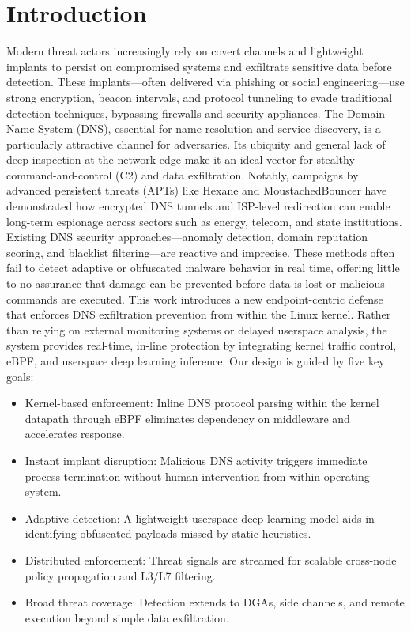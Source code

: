 \documentclass[letterpaper,twocolumn,10pt]{article}
\begin{document}
\section{Introduction}
Modern threat actors increasingly rely on covert channels and lightweight implants to persist on compromised systems and exfiltrate sensitive data before detection. These implants—often delivered via phishing or social engineering—use strong encryption, beacon intervals, and protocol tunneling to evade traditional detection techniques, bypassing firewalls and security appliances.
The Domain Name System (DNS), essential for name resolution and service discovery, is a particularly attractive channel for adversaries. Its ubiquity and general lack of deep inspection at the network edge make it an ideal vector for stealthy command-and-control (C2) and data exfiltration. Notably, campaigns by advanced persistent threats (APTs) like Hexane and MoustachedBouncer have demonstrated how encrypted DNS tunnels and ISP-level redirection can enable long-term espionage across sectors such as energy, telecom, and state institutions.
Existing DNS security approaches—anomaly detection, domain reputation scoring, and blacklist filtering—are reactive and imprecise. These methods often fail to detect adaptive or obfuscated malware behavior in real time, offering little to no assurance that damage can be prevented before data is lost or malicious commands are executed.
This work introduces a new endpoint-centric defense that enforces DNS exfiltration prevention from within the Linux kernel. Rather than relying on external monitoring systems or delayed userspace analysis, the system provides real-time, in-line protection by integrating kernel traffic control, eBPF, and userspace deep learning inference.
Our design is guided by five key goals:
\begin{itemize}[nosep]
    \item Kernel-based enforcement: Inline DNS protocol parsing within the kernel datapath through eBPF eliminates dependency on middleware and accelerates response.
    \item Instant implant disruption: Malicious DNS activity triggers immediate process termination without human intervention from within operating system.
    \item Adaptive detection: A lightweight userspace deep learning model aids in identifying obfuscated payloads missed by static heuristics.
    \item Distributed enforcement: Threat signals are streamed for scalable cross-node policy propagation and L3/L7 filtering.
    \item Broad threat coverage: Detection extends to DGAs, side channels, and remote execution beyond simple data exfiltration.
\end{itemize}
\end{document}
